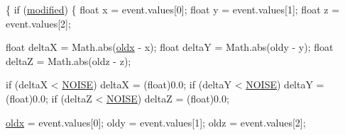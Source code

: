 \begin{DoxyCode}
                                                   \{
        \textcolor{keywordflow}{if} (\hyperlink{classnpi_1_1practicaandroid_1_1tutorialnpi_1_1_accelerometer_a525132490dab752030175fe7bf6fd4c4}{modified}) \{
            \textcolor{keywordtype}{float} x = \textcolor{keyword}{event}.values[0];
            \textcolor{keywordtype}{float} y = \textcolor{keyword}{event}.values[1];
            \textcolor{keywordtype}{float} z = \textcolor{keyword}{event}.values[2];
            
            \textcolor{keywordtype}{float} deltaX = Math.abs(\hyperlink{classnpi_1_1practicaandroid_1_1tutorialnpi_1_1_accelerometer_adeab08257cb4a687507a01ed9f4a38b6}{oldx} - x);
            \textcolor{keywordtype}{float} deltaY = Math.abs(oldy - y);
            \textcolor{keywordtype}{float} deltaZ = Math.abs(oldz - z);
            
            \textcolor{keywordflow}{if} (deltaX < \hyperlink{classnpi_1_1practicaandroid_1_1tutorialnpi_1_1_accelerometer_a1bfd98ab9d7bf8fc65bbd8454f7c7625}{NOISE}) deltaX = (float)0.0;
            \textcolor{keywordflow}{if} (deltaY < \hyperlink{classnpi_1_1practicaandroid_1_1tutorialnpi_1_1_accelerometer_a1bfd98ab9d7bf8fc65bbd8454f7c7625}{NOISE}) deltaY = (float)0.0;
            \textcolor{keywordflow}{if} (deltaZ < \hyperlink{classnpi_1_1practicaandroid_1_1tutorialnpi_1_1_accelerometer_a1bfd98ab9d7bf8fc65bbd8454f7c7625}{NOISE}) deltaZ = (float)0.0;
            
            \hyperlink{classnpi_1_1practicaandroid_1_1tutorialnpi_1_1_accelerometer_adeab08257cb4a687507a01ed9f4a38b6}{oldx} = \textcolor{keyword}{event}.values[0];
            oldy = \textcolor{keyword}{event}.values[1];
            oldz = \textcolor{keyword}{event}.values[2];
            

\end{DoxyCode}
